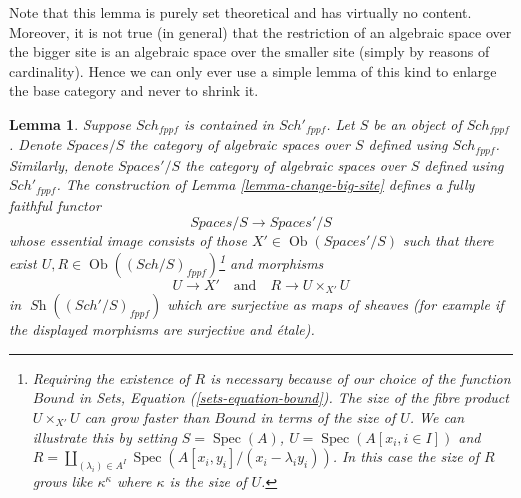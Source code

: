 \documentclass{stacks-project}
\theoremstyle{plain}
\newtheorem{lemma}[subsection]{Lemma}
\theoremstyle{definition}
\theoremstyle{remark}
\numberwithin{equation}{subsection}
\def\Spec{\mathop{\mathrm{Spec}}}
\def\Sch{\mathit{Sch}}
\def\Ob{\mathop{\mathrm{Ob}}\nolimits}
\def\Sh{\mathop{\mathit{Sh}}\nolimits}
\begin{document}
\noindent
Note that this lemma is purely set theoretical and has virtually no content.
Moreover, it is not true (in general) that the restriction of an algebraic
space over the bigger site is an algebraic space over the smaller site (simply
by reasons of cardinality). Hence we can only ever use a simple lemma of this
kind to enlarge the base category and never to shrink it.

\begin{lemma}
\label{lemma-fully-faithful}
Suppose $\Sch_{fppf}$ is contained in $\Sch'_{fppf}$.
Let $S$ be an object of $\Sch_{fppf}$. Denote
$\textit{Spaces}/S$ the category of algebraic spaces over $S$
defined using $\Sch_{fppf}$. Similarly, denote
$\textit{Spaces}'/S$ the category of algebraic spaces over $S$
defined using $\Sch'_{fppf}$. The construction of
Lemma \ref{lemma-change-big-site}
defines a fully faithful functor
$$
\textit{Spaces}/S \longrightarrow \textit{Spaces}'/S
$$
whose essential image consists of those $X' \in \Ob(\textit{Spaces}'/S)$
such that there exist $U, R \in \Ob((\Sch/S)_{fppf})$\footnote{Requiring the
existence of $R$ is necessary because of our choice of the function $Bound$ in
Sets, Equation (\ref{sets-equation-bound}). The size of the fibre product
$U \times_{X'} U$ can grow faster than $Bound$ in terms of the size of $U$. We
can illustrate this by setting $S = \Spec(A)$, $U = \Spec(A[x_i, i \in I])$ and
$R = \coprod_{(\lambda_i) \in A^I} \Spec(A[x_i, y_i]/(x_i - \lambda_i y_i))$.
In this case the size of $R$ grows like $\kappa^\kappa$ where $\kappa$ is the
size of $U$.} and morphisms
$$
U \longrightarrow X'
\quad\text{and}\quad
R \longrightarrow U \times_{X'} U
$$
in $\Sh((\Sch'/S)_{fppf})$ which are surjective as maps of sheaves
(for example if the displayed morphisms are surjective and \'etale).
\end{lemma}
\end{document}

